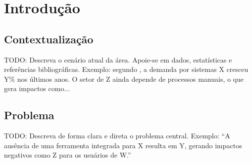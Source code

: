 %

\chapter{Introdução}
\label{cap:introducao}


\section{Contextualização}
\label{sec:contextualizacao}

TODO: Descreva o cenário atual da área. Apoie-se em dados, estatísticas e
referências bibliográficas. Exemplo: segundo , a
demanda por sistemas X cresceu Y\% nos últimos anos. O setor de Z ainda
depende de processos manuais, o que gera impactos como...


\section{Problema}
\label{sec:problema}

TODO: Descreva de forma clara e direta o problema central. Exemplo:
``A ausência de uma ferramenta integrada para X resulta em Y, gerando
impactos negativos como Z para os usuários de W.''


